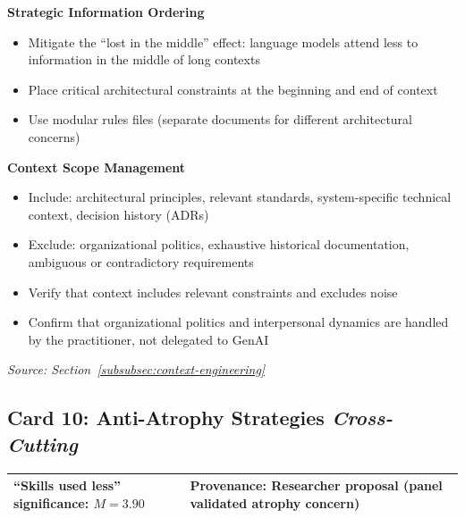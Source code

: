 \vspace{0.5em}
\textbf{Strategic Information Ordering}
\begin{itemize}
    \item Mitigate the ``lost in the middle'' effect: language models attend less to information in the middle of long contexts
\end{itemize}
\begin{itemize}[label=\checkbox]
    \item Place critical architectural constraints at the beginning and end of context
    \item Use modular rules files (separate documents for different architectural concerns)
\end{itemize}

\vspace{0.5em}
\textbf{Context Scope Management}
\begin{itemize}
    \item Include: architectural principles, relevant standards, system-specific technical context, decision history (ADRs)
    \item Exclude: organizational politics, exhaustive historical documentation, ambiguous or contradictory requirements
\end{itemize}
\begin{itemize}[label=\checkbox]
    \item Verify that context includes relevant constraints and excludes noise
    \item Confirm that organizational politics and interpersonal dynamics are handled by the practitioner, not delegated to GenAI
\end{itemize}

\vspace{0.5em}
\textit{Source: Section~\ref{subsubsec:context-engineering}}

\clearpage
\subsection*{Card 10: Anti-Atrophy Strategies \hfill \textit{Cross-Cutting}}

\begin{tabular}{|p{7cm}|p{6cm}|}
    \hline
    \textbf{``Skills used less'' significance:} $M = 3.90$ & \textbf{Provenance:} Researcher proposal (panel validated atrophy concern) \\
    \hline
\end{tabular}

